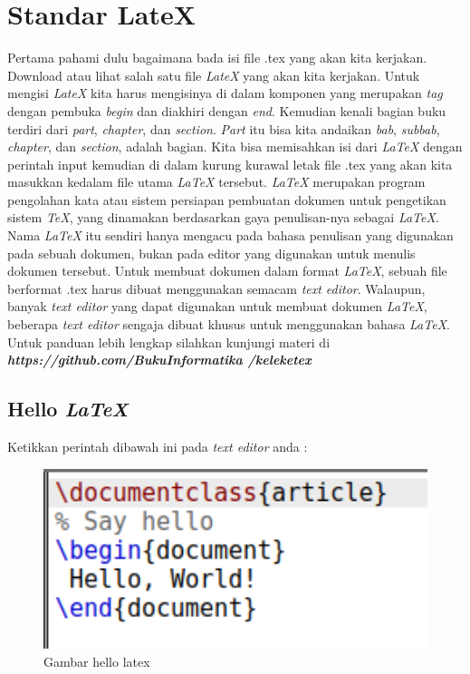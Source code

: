 \chapter{Standar LateX}
Pertama pahami dulu bagaimana bada isi file .tex yang akan kita kerjakan. Download atau lihat salah satu file \textit{LateX} yang akan kita kerjakan. Untuk mengisi \textit{LateX} kita harus mengisinya di dalam komponen yang merupakan \textit{tag} dengan pembuka \textit{begin} dan diakhiri dengan \textit{end}. Kemudian kenali bagian buku terdiri dari \textit{part}, \textit{chapter}, dan \textit{section}. \textit{Part} itu bisa kita andaikan \textit{bab}, \textit{subbab}, \textit{chapter}, dan \textit{section}, adalah bagian. Kita bisa memisahkan isi dari \textit{LaTeX} dengan perintah input kemudian di dalam kurung kurawal letak file .tex yang akan kita masukkan kedalam file utama \textit{LaTeX} tersebut. \textit{LaTeX} merupakan program pengolahan kata atau sistem persiapan pembuatan dokumen untuk pengetikan sistem \textit{TeX}, yang dinamakan berdasarkan gaya penulisan-nya sebagai \textit{LaTeX}. Nama \textit{LaTeX} itu sendiri hanya mengacu pada bahasa penulisan yang digunakan pada sebuah dokumen, bukan pada editor yang digunakan untuk menulis dokumen tersebut. Untuk membuat dokumen dalam format \textit{LaTeX}, sebuah file berformat .tex harus dibuat menggunakan semacam \textit{text editor}. Walaupun, banyak \textit{text editor} yang dapat digunakan untuk membuat dokumen \textit{LaTeX}, beberapa \textit{text editor} sengaja dibuat khusus untuk menggunakan bahasa \textit{LaTeX}. Untuk panduan lebih lengkap silahkan kunjungi materi di \textbf{\textit{https://github.com/BukuInformatika
/keleketex}}

\section{Hello \textit{LaTeX}}
Ketikkan perintah dibawah ini pada \textit{text editor} anda :
		\begin{figure}[H]
		\centering
		\includegraphics[width=1\textwidth]{figures/hello.png}
		\caption{Gambar hello latex}
		\end{figure}


